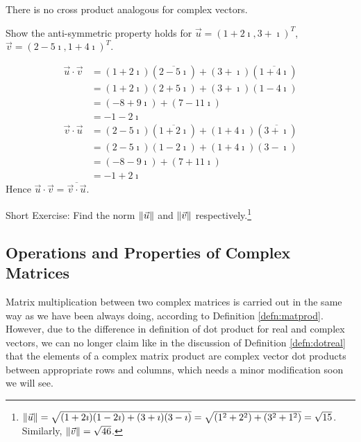 There is no cross product analogous for complex vectors.
\begin{exmp}
Show the anti-symmetric property holds for $\vec{u} = (1+2\imath, 3+\imath)^T$, $\vec{v} = (2-5\imath, 1+4\imath)^T$.
\end{exmp}
\begin{solution}
\begin{align*}
\vec{u} \cdot \vec{v} &= (1+2\imath)(\overline{2-5\imath}) + (3+\imath)(\overline{1+4\imath}) \\
&= (1+2\imath)(2+5\imath) + (3+\imath)(1-4\imath) \\
&= (-8+9\imath) + (7-11\imath) \\
&= -1-2\imath 
\end{align*}
\begin{align*}
\vec{v} \cdot \vec{u} &= (2-5\imath)(\overline{1+2\imath}) + (1+4\imath)(\overline{3+\imath}) \\
&= (2-5\imath)(1-2\imath) + (1+4\imath)(3-\imath) \\
&= (-8-9\imath) + (7+11\imath) \\
&= -1+2\imath 
\end{align*}
Hence $\vec{u} \cdot \vec{v} = \overline{\vec{v} \cdot \vec{u}}$.
\end{solution}

Short Exercise: Find the norm $\norm{\vec{u}}$ and $\norm{\vec{v}}$ respectively.\footnote{$\norm{\vec{u}} = \sqrt{(1+2\imath)(1-2\imath) + (3+\imath)(3-\imath)} = \sqrt{(1^2 + 2^2) + (3^2 + 1^2)} = \sqrt{15}$. Similarly, $\norm{\vec{v}} = \sqrt{46}$.}

\subsection{Operations and Properties of Complex Matrices}
Matrix multiplication between two complex matrices is carried out in the same way as we have been always doing, according to Definition \ref{defn:matprod}. However, due to the difference in definition of dot product for real and complex vectors, we can no longer claim like in the discussion of Definition \ref{defn:dotreal} that the elements of a complex matrix product are complex vector dot products between appropriate rows and columns, which needs a minor modification soon we will see. 

